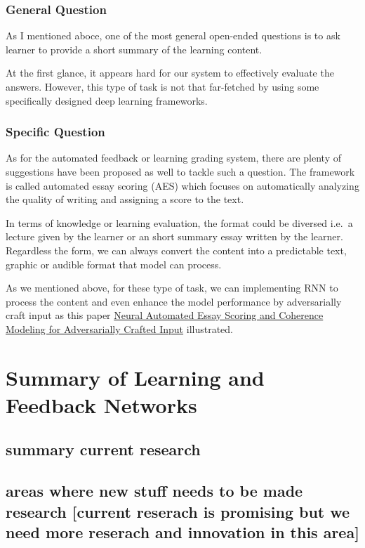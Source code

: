 \documentclass[]{book}
\theoremstyle{definition}
\theoremstyle{definition}
\theoremstyle{definition}
\theoremstyle{remark}
\begin{document}
\subsubsection{General Question}\label{general-question}

As I mentioned aboce, one of the most general open-ended questions is to
ask learner to provide a short summary of the learning content.

At the first glance, it appears hard for our system to effectively
evaluate the answers. However, this type of task is not that far-fetched
by using some specifically designed deep learning frameworks.

\subsubsection{Specific Question}\label{specific-question}

As for the automated feedback or learning grading system, there are
plenty of suggestions have been proposed as well to tackle such a
question. The framework is called automated essay scoring (AES) which
focuses on automatically analyzing the quality of writing and assigning
a score to the text.

In terms of knowledge or learning evaluation, the format could be
diversed i.e.~a lecture given by the learner or an short summary essay
written by the learner. Regardless the form, we can always convert the
content into a predictable text, graphic or audible format that model
can process.

As we mentioned above, for these type of task, we can implementing RNN
to process the content and even enhance the model performance by
adversarially craft input as this paper
\href{http://aclweb.org/anthology/N18-1024}{Neural Automated Essay
Scoring and Coherence Modeling for Adversarially Crafted Input}
illustrated.

\section{Summary of Learning and Feedback
Networks}\label{summary-of-learning-and-feedback-networks}

\subsection{summary current research}\label{summary-current-research}

\subsection{areas where new stuff needs to be made research {[}current
reserach is promising but we need more reserach and innovation in this
area{]}}\label{areas-where-new-stuff-needs-to-be-made-research-current-reserach-is-promising-but-we-need-more-reserach-and-innovation-in-this-area}
\end{document}
